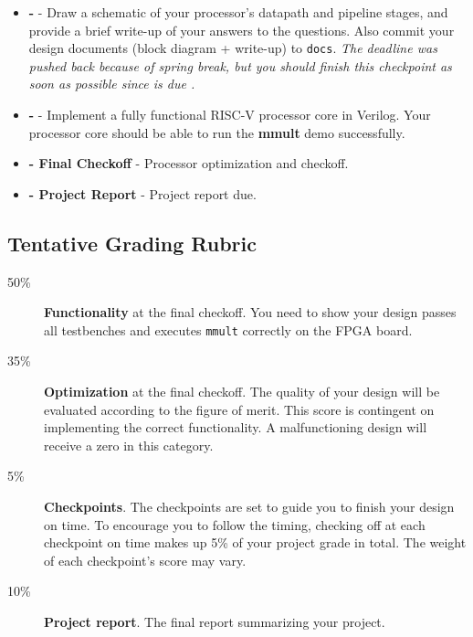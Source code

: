 \begin{minipage}{\textwidth}
\vspace{2mm}
\begin{itemize}
\item \textbf{\blockDiagramDueDate \space - \blockDiagramTaskName} -
  Draw a schematic of your processor's datapath and pipeline stages,
  and provide a brief write-up of your answers to the questions.
  Also commit your design documents (block diagram + write-up) to \verb|docs|.
  {\it The deadline was pushed back because of spring break,
  but you should finish this checkpoint as soon as possible
  since \baseCPUTaskName \space is due \baseCPUDueDate.}

\item \textbf{\baseCPUDueDate \space - \baseCPUTaskName} -
  Implement a fully functional RISC-V processor core in Verilog.
  Your processor core should be able to run the \textbf{mmult} demo successfully.

\item \textbf{\finalCheckoffDueDate \space - Final Checkoff} -
  Processor optimization and checkoff.
    
\item \textbf{\finalReportDueDate \space - Project Report} -
  Project report due.
\end{itemize}
\vspace{2mm}
\end{minipage}


\clearpage
\subsection{Tentative Grading Rubric}
\begin{framed}
\begin{description}
\item[50\%] {\bf Functionality} at the final checkoff.
  You need to show your design passes all testbenches
  and executes \verb|mmult| correctly on the FPGA board.
\item[35\%] {\bf Optimization} at the final checkoff.
  The quality of your design will be evaluated according to the figure of merit.
  This score is contingent on implementing the correct functionality.
  A malfunctioning design will receive a zero in this category.
\item[5\%] {\bf Checkpoints}.
  The checkpoints are set to guide you to finish your design on time.
  To encourage you to follow the timing,
  checking off at each checkpoint on time makes up 5\% of your project grade in total.
  The weight of each checkpoint's score may vary.
\item[10\%] {\bf Project report}.
  The final report summarizing your project.
\end{description}
\end{framed}


